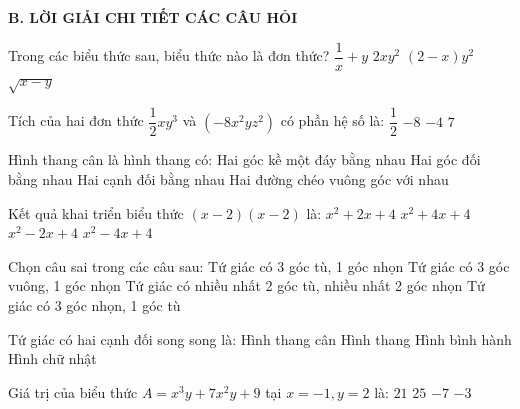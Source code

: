 \documentclass[12pt,a4paper]{article}
\begin{document}
\noindent\textbf{\large B. LỜI GIẢI CHI TIẾT CÁC CÂU HỎI}
\vspace{1mm}
\begin{ex}
Trong các biểu thức sau, biểu thức nào là đơn thức?
\choice
{$\dfrac{1}{x} + y$}
{\True $2xy^2$}
{$(2 - x)y^2$}
{$\sqrt{x - y}$}
\end{ex}

\begin{ex}
Tích của hai đơn thức $\dfrac{1}{2}xy^3$ và $(-8x^2yz^2)$ có phần hệ số là:
\choice
{$\dfrac{1}{2}$}
{$-8$}
{\True $-4$}
{$7$}
\end{ex}

\begin{ex}
Hình thang cân là hình thang có:
\choice
{\True Hai góc kề một đáy bằng nhau}
{Hai góc đối bằng nhau}
{Hai cạnh đối bằng nhau}
{Hai đường chéo vuông góc với nhau}
\end{ex}

\begin{ex}
Kết quả khai triển biểu thức $(x - 2)(x - 2)$ là:
\choice
{$x^2 + 2x + 4$}
{$x^2 + 4x + 4$}
{$x^2 - 2x + 4$}
{\True $x^2 - 4x + 4$}
\end{ex}

\begin{ex}
Chọn câu sai trong các câu sau:
\choice
{Tứ giác có 3 góc tù, 1 góc nhọn}
{\True Tứ giác có 3 góc vuông, 1 góc nhọn}
{Tứ giác có nhiều nhất 2 góc tù, nhiều nhất 2 góc nhọn}
{Tứ giác có 3 góc nhọn, 1 góc tù}
\end{ex}

\begin{ex}
Tứ giác có hai cạnh đối song song là:
\choice
{Hình thang cân}
{\True Hình thang}
{Hình bình hành}
{Hình chữ nhật}
\end{ex}

\begin{ex}
Giá trị của biểu thức $A = x^3y + 7x^2y + 9$ tại $x = -1, y = 2$ là:
\choice
{\True $21$}
{$25$}
{$-7$}
{$-3$}
\end{ex}
\end{document}
